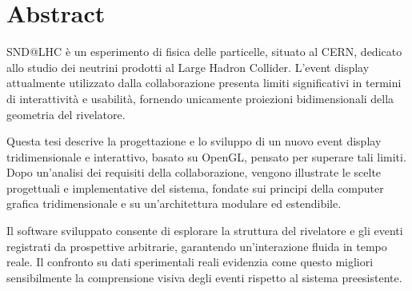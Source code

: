 \chapter*{Abstract}
\thispagestyle{empty}
SND@LHC è un esperimento di fisica delle particelle, situato al CERN, dedicato allo studio dei neutrini prodotti al Large Hadron Collider.
L'event display attualmente utilizzato dalla collaborazione presenta limiti significativi in termini di interattività e usabilità, fornendo unicamente proiezioni bidimensionali della geometria del rivelatore.

Questa tesi descrive la progettazione e lo sviluppo di un nuovo event display tridimensionale e interattivo, basato su OpenGL, pensato per superare tali limiti.
Dopo un'analisi dei requisiti della collaborazione, vengono illustrate le scelte progettuali e implementative del sistema, fondate sui principi della computer grafica tridimensionale e su un'architettura modulare ed estendibile.

Il software sviluppato consente di esplorare la struttura del rivelatore e gli eventi registrati da prospettive arbitrarie, garantendo un'interazione fluida in tempo reale.
Il confronto su dati sperimentali reali evidenzia come questo migliori sensibilmente la comprensione visiva degli eventi rispetto al sistema preesistente.